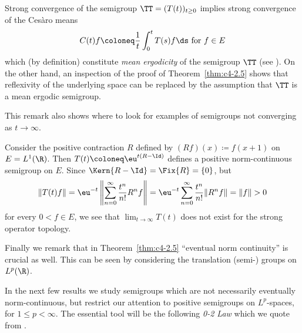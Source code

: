 Strong convergence of the semigroup $\TT = (T(t))_{t \geq 0}$ implies strong convergence of the Cesàro means 
\[
C(t)f \coloneq  \frac{1}{t}\int_{0}^{t} T(s)f \ds \text{ for } f \in E
\]
which (by definition) constitute \emph{mean ergodicity} of the semigroup $\TT$ (see \textcite[Chap.5.1]{davies:1980}).
On the other hand, an inspection of the proof of Theorem~\ref{thm:c4-2.5} shows that reflexivity of the underlying space can be replaced by the assumption that $\TT$ is a mean ergodic semigroup.

This remark also shows where to look for examples of semigroups not converging as $t \to \infty$.

Consider the positive contraction $R$ defined by $(Rf)(x) \coloneq f(x+1)$ on $E = L^{1}(\R)$.
Then $T(t) \coloneq \eu^{t(R-\Id)}$ defines a positive norm-continuous semigroup on $E$.
Since $\Kern{R - \Id} = \Fix{R} = \{0\}$, but 
\[
\|T(t)f\| = \eu^{-t} \left\|\sum_{n=0}^{\infty} \frac{t^n}{n!}R^{n}f\right\| = 
\eu^{-t}\sum_{n=0}^{\infty} \frac{t^n}{n!}\|R^{n}f\|= \|f\| > 0
\] 
for every $0 < f \in E$, we see that $\lim_{t\to\infty} T(t)$ does not exist for the strong operator topology.

Finally we remark that in Theorem~\ref{thm:c4-2.5} \enquote{eventual norm continuity} is crucial as well.
This can be seen by considering the translation (semi-) groups on $L^{p}(\R)$.

In the next few results we study semigroups which are not necessarily eventually norm-continuous, but restrict our attention to positive semigroups on $L^{p}$-spaces, for $1 \leq p < \infty$.
The essential tool will be the following \emph{0-2 Law} which we quote from \textcite[Theorem~3.7]{greiner:1982}.

